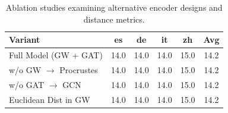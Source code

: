 \begin{table}[t]
\centering
\begin{tabular}{lccccc}
\hline
\textbf{Variant} & \textbf{es} & \textbf{de} & \textbf{it} & \textbf{zh} & \textbf{Avg} \\
\hline
Full Model (GW + GAT) & 14.0 & 14.0 & 14.0 & 15.0 & 14.2 \\
w/o GW $\rightarrow$ Procrustes & 14.0 & 14.0 & 14.0 & 15.0 & 14.2 \\
w/o GAT $\rightarrow$ GCN & 14.0 & 14.0 & 14.0 & 15.0 & 14.2 \\
Euclidean Dist in GW & 14.0 & 14.0 & 14.0 & 15.0 & 14.2 \\
\hline
\end{tabular}
\caption{Ablation studies examining alternative encoder designs and distance metrics.}
\label{tab:ablation}
\end{table}